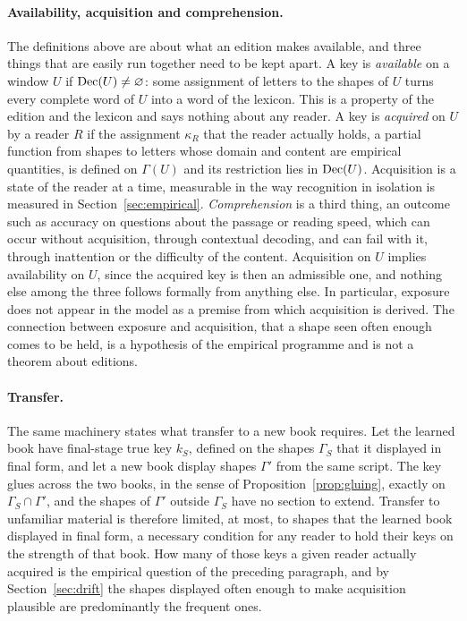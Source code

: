 \paragraph{Availability, acquisition and comprehension.}
The definitions above are about what an edition makes available, and three things that are easily run together need to be kept apart. A key is \emph{available} on a window $U$ if $\mathrm{Dec}(U)\neq\varnothing$: some assignment of letters to the shapes of $U$ turns every complete word of $U$ into a word of the lexicon. This is a property of the edition and the lexicon and says nothing about any reader. A key is \emph{acquired} on $U$ by a reader $R$ if the assignment $\kappa_R$ that the reader actually holds, a partial function from shapes to letters whose domain and content are empirical quantities, is defined on $\Gamma(U)$ and its restriction lies in $\mathrm{Dec}(U)$. Acquisition is a state of the reader at a time, measurable in the way recognition in isolation is measured in Section~\ref{sec:empirical}. \emph{Comprehension} is a third thing, an outcome such as accuracy on questions about the passage or reading speed, which can occur without acquisition, through contextual decoding, and can fail with it, through inattention or the difficulty of the content. Acquisition on $U$ implies availability on $U$, since the acquired key is then an admissible one, and nothing else among the three follows formally from anything else. In particular, exposure does not appear in the model as a premise from which acquisition is derived. The connection between exposure and acquisition, that a shape seen often enough comes to be held, is a hypothesis of the empirical programme and is not a theorem about editions.

\paragraph{Transfer.}
The same machinery states what transfer to a new book requires. Let the learned book have final-stage true key $k_S$, defined on the shapes $\Gamma_S$ that it displayed in final form, and let a new book display shapes $\Gamma'$ from the same script. The key glues across the two books, in the sense of Proposition~\ref{prop:gluing}, exactly on $\Gamma_S\cap\Gamma'$, and the shapes of $\Gamma'$ outside $\Gamma_S$ have no section to extend. Transfer to unfamiliar material is therefore limited, at most, to shapes that the learned book displayed in final form, a necessary condition for any reader to hold their keys on the strength of that book. How many of those keys a given reader actually acquired is the empirical question of the preceding paragraph, and by Section~\ref{sec:drift} the shapes displayed often enough to make acquisition plausible are predominantly the frequent ones.


